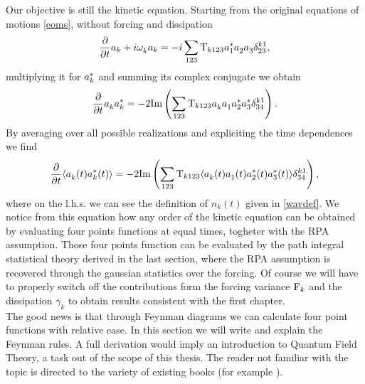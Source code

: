 Our objective is still the kinetic equation. Starting from the original equations of motions \eqref{eoms}, without forcing and dissipation
\begin{equation}
    \frac{\partial}{\partial t} a_k + i \omega^{}_k a_k = -i \sum_{123}\mathrm{T}_{k123} a_1^{*}a_2^{}a_3^{} \delta^{k1}_{23},
\end{equation}
multiplying it for $a_k^{*}$ and summing its complex conjugate we obtain
\begin{equation}
    \frac{\partial}{\partial t} a_k^{} a_k^{*} = -2 \text{Im}\left( \sum_{123}\mathrm{T}_{k123}a_k^{} a_1^{} a_2^{*} a_3^{*} \delta^{k1}_{34} \right).
\end{equation} 
By averaging over all possible realizations and expliciting the time dependences we find
\begin{equation}
    \frac{\partial}{\partial t} \langle a_k^{}(t) a_k^{*}(t) \rangle = -2 \text{Im}\left( \sum_{123}\mathrm{T}_{k123}\langle a_k^{}(t) a_1^{} (t)a_2^{*}(t) a_3^{*} (t)\rangle\delta^{k1}_{34} \right),
    \label{kineticprototype}
\end{equation}
where on the l.h.s. we can see the definition of $n_k(t)$ given in \eqref{wavdef}. We notice from this equation how any order of the kinetic equation can be obtained 
by evaluating four points functions at equal times, togheter with the RPA assumption. Those four points function can be evaluated by the path integral statistical theory 
derived in the last section, where the RPA assumption is recovered through the gaussian statistics over the forcing. Of course we will have to properly 
switch off the contributions form the forcing variance $\mathrm{F}_k$ and the dissipation $\gamma_k$ to obtain results consistent with the first chapter. \\
The good news is that through Feynman diagrams we can calculate four point functions with relative ease. In this section we will write and explain the Feynman rules. 
A full derivation would imply an introduction to Quantum Field Theory, a task out of the scope of this thesis. The reader not familiar with the topic is directed to 
the variety of existing books (for example \cite{Bjorken:1965zz}). \\

